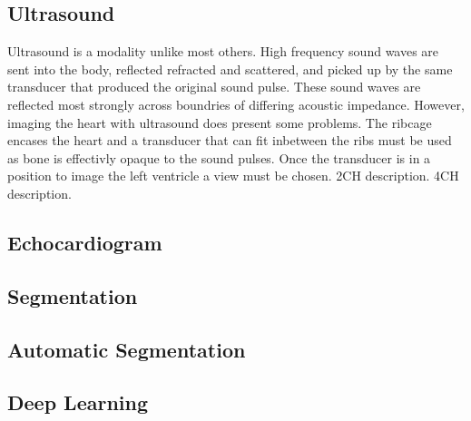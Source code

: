 \documentclass{article}
\begin{document}

\subsection{Ultrasound}

Ultrasound is a modality unlike most others. 
High frequency sound waves are sent into the body, reflected refracted and scattered, and picked up by the same transducer that produced the original sound pulse. 
These sound waves are reflected most strongly across boundries of differing acoustic impedance.
However, imaging the heart with ultrasound does present some problems.
The ribcage encases the heart and a transducer that can fit inbetween the ribs must be used as bone is effectivly opaque to the sound pulses. 
Once the transducer is in a position to image the left ventricle a view must be chosen. 
2CH description.
4CH description. 
\subsection{Echocardiogram}
\subsection{Segmentation}
\subsection{Automatic Segmentation}
\subsection{Deep Learning}
\end{document}

